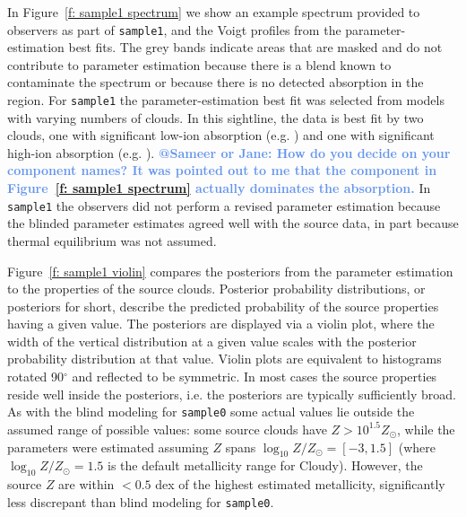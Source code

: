 \documentclass[fleqn,usenatbib]{mnras}
\makeatletter
\newcommand{\atsameer}[1]{\textcolor{CornflowerBlue}{\textbf{@Sameer or Jane: #1}}}
\makeatother
\begin{document}
In Figure~\ref{f: sample1 spectrum} we show an example spectrum provided to observers as part of \texttt{sample1}, and the Voigt profiles from the parameter-estimation best fits.
The grey bands indicate areas that are masked and do not contribute to parameter estimation because there is a blend known to contaminate the spectrum or because there is no detected absorption in the region.
For \texttt{sample1} the parameter-estimation best fit was selected from models with varying numbers of clouds. In this sightline, the data is best fit by two clouds, one with significant low-ion absorption (e.g. )  and one with significant high-ion absorption (e.g. ).
\atsameer{How do you decide on your component names? It was pointed out to me that the \ion{O}{VI} component in Figure~\ref{f: sample1 spectrum} actually dominates the \ion{C}{II} absorption.}
In \texttt{sample1} the observers did not perform a revised parameter estimation because the blinded parameter estimates agreed well with the source data, in part because thermal equilibrium was not assumed.

Figure~\ref{f: sample1 violin} compares the posteriors from the parameter estimation to the properties of the source clouds.
Posterior probability distributions, or posteriors for short, describe the predicted probability of the source properties having a given value.
The posteriors are displayed via a violin plot,
where the width of the vertical distribution at a given value scales with the posterior probability distribution at that value.
Violin plots are equivalent to histograms rotated 90$^\circ$ and reflected to be symmetric.
In most cases the source properties reside well inside the posteriors, i.e. the posteriors are typically sufficiently broad.
As with the blind modeling for \texttt{sample0} some actual values lie outside the assumed range of possible values: 
some source clouds have $Z > 10^{1.5} Z_\odot$, while the parameters were estimated assuming $Z$ spans $\log_{10} Z/Z_\odot = [-3, 1.5]$ (where $\log_{10} Z/Z_\odot = 1.5$ is the default metallicity range for Cloudy).
However, the source $Z$ are within $< 0.5$ dex of the highest estimated metallicity, significantly less discrepant than blind modeling for \texttt{sample0}.
\end{document}
